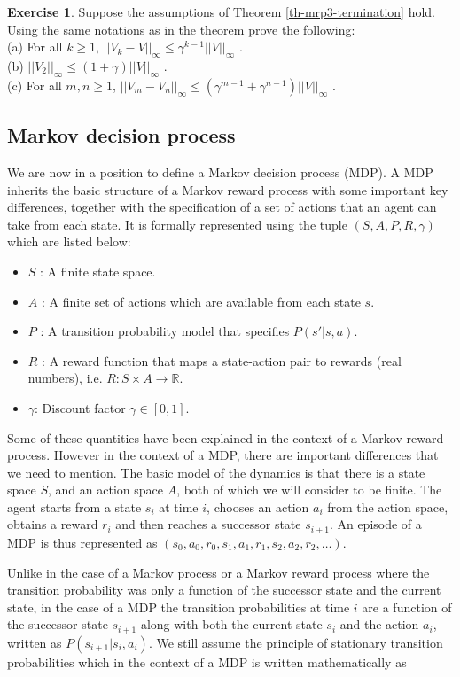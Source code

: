 \documentclass{article}
\theoremstyle{definition}
\newtheorem{exercise}{Exercise}[section]
\theoremstyle{remark}
\begin{document}
\begin{exercise}
Suppose the assumptions of Theorem \ref{th-mrp3-termination} hold. Using the same notations as in the theorem prove the following:\\
(a) For all $k \geq 1$, $||V_k - V||_{\infty} \leq \gamma^{k-1}||V||_{\infty}$ \;.\\
(b) $||V_2||_{\infty} \leq (1 + \gamma) ||V||_{\infty}$ \;.\\
(c) For all $m,n \geq 1$, $||V_m - V_n||_{\infty} \leq (\gamma^{m-1} + \gamma^{n-1})||V||_{\infty}$ \;.
\label{ex-mrp3-maxchange}
\end{exercise}

\subsection{Markov decision process}
We are now in a position to define a Markov decision process (MDP). A MDP inherits the basic structure of a Markov reward process with some important key differences, together with the specification of a set of actions that an agent can take from each state. It is formally represented using the tuple $(S,A,P,R,\gamma)$ which are listed below:
\begin{itemize}
\item $S$ : A finite state space.
\item $A$ : A finite set of actions which are available from each state $s$.
\item $P$ : A transition probability model that specifies $P(s'|s,a)$.
\item $R$ : A reward function that maps a state-action pair to rewards (real numbers), i.e. $R : S \times A \rightarrow \mathbb{R}$.
\item $\gamma$: Discount factor $\gamma \in [0,1]$.
\end{itemize}

Some of these quantities have been explained in the context of a Markov reward process. However in the context of a MDP, there are important differences that we need to mention. The basic model of the dynamics is that there is a state space $S$, and an action space $A$, both of which we will consider to be finite. The agent starts from a state $s_i$ at time $i$, chooses an action $a_i$ from the action space, obtains a reward $r_i$ and then reaches a successor state $s_{i+1}$. An episode of a MDP is thus represented as $(s_0,a_0,r_0,s_1,a_1,r_1,s_2,a_2,r_2,\dots)$.

Unlike in the case of a Markov process or a Markov reward process where the transition probability was only a function of the successor state and the current state, in the case of a MDP the transition probabilities at time $i$ are a function of the successor state $s_{i+1}$ along with both the current state $s_i$ and the action $a_i$, written as $P(s_{i+1}|s_i,a_i)$. We still assume the principle of stationary transition probabilities which in the context of a MDP is written mathematically as
\end{document}
